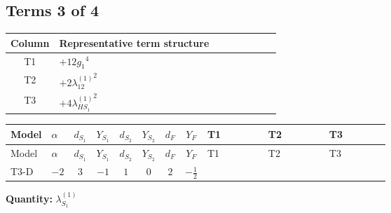 \documentclass[8pt]{article}
\begin{document}
\begin{landscape}
\subsection*{Terms 3 of 4}
\begin{center}
\begin{tabular}{@{}c >{\raggedright\arraybackslash}p{0.82\linewidth}@{}}
\toprule
Column & Representative term structure \\
\midrule
T1 & \(\displaystyle +12 {g_1}^4\) \\
\midrule
T2 & \(\displaystyle +2 {\lambda_{12}^{(1)}}^2\) \\
\midrule
T3 & \(\displaystyle +4 {\lambda_{HS_1}^{(1)}}^2\) \\
\midrule
\bottomrule
\end{tabular}
\end{center}
\smallskip
\tiny
\begin{longtable}{@{}llcccccc >{\raggedright\arraybackslash}p{0.21\linewidth} >{\raggedright\arraybackslash}p{0.21\linewidth} >{\raggedright\arraybackslash}p{0.21\linewidth}@{}}
\toprule
Model & $\alpha$ & $d_{S_1}$ & $Y_{S_1}$ & $d_{S_2}$ & $Y_{S_2}$ & $d_F$ & $Y_F$ & T1 & T2 & T3 \\
\midrule
\endfirsthead
\toprule
Model & $\alpha$ & $d_{S_1}$ & $Y_{S_1}$ & $d_{S_2}$ & $Y_{S_2}$ & $d_F$ & $Y_F$ & T1 & T2 & T3 \\
\midrule
\endhead
T3-D & $-2$ & $3$ & $-1$ & $1$ & $0$ & $2$ & $-\frac{1}{2}$ & \scriptsize\adjustbox{max width=\linewidth}{$\begin{gathered} +12 {g_1}^4\end{gathered}$} & \scriptsize\adjustbox{max width=\linewidth}{$\begin{gathered} +2 {\lambda_{12}^{(1)}}^2\end{gathered}$} & \scriptsize\adjustbox{max width=\linewidth}{$\begin{gathered} +4 {\lambda_{HS_1}^{(1)}}^2\end{gathered}$} \\
\midrule
\bottomrule
\end{longtable}
\clearpage
\noindent\textbf{Quantity: }$\lambda_{S_1}^{(1)}$\par\smallskip

\end{landscape}
\end{document}
